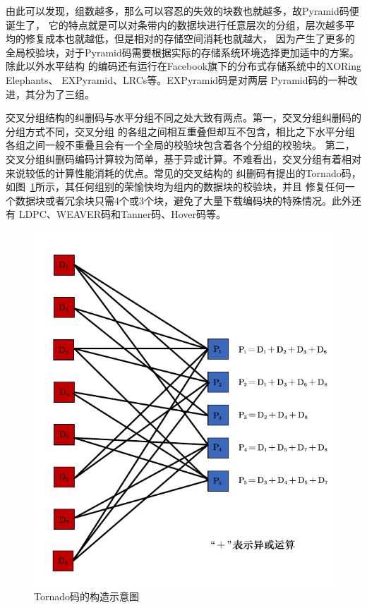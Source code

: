 由此可以发现，组数越多，那么可以容忍的失效的块数也就越多，故Pyramid码\cite{huang2013pyramid}便诞生了，
它的特点就是可以对条带内的数据块进行任意层次的分组，层次越多平均的修复成本也就越低，但是相对的存储空间消耗也就越大，
因为产生了更多的全局校验块，对于Pyramid码需要根据实际的存储系统环境选择更加适中的方案。除此以外水平结构
的编码还有运行在Facebook旗下的分布式存储系统中的XORing Elephants\cite{sathiamoorthy2013xoring}、
EXPyramid\cite{周松2011expyramid}、LRCs\cite{sathiamoorthy2013xoring}等。EXPyramid码是对两层
Pyramid码的一种改进，其分为了三组。

交叉分组结构的纠删码与水平分组不同之处大致有两点。第一，交叉分组纠删码的分组方式不同，交叉分组
的各组之间相互重叠但却互不包含，相比之下水平分组各组之间一般不重叠且会有一个全局的校验块包含着各个分组的校验块。
第二，交叉分组纠删码编码计算较为简单，基于异或计算。不难看出，交叉分组有着相对来说较低的计算性能消耗的优点。常见的交叉结构的
纠删码有\citet{woitaszek2007tornado}提出的Tornado码，如图~\ref{fig:con-1.8}所示，其任何组别的荣愉快均为组内的数据块的校验块，并且
修复任何一个数据块或者冗余块只需4个或3个块，避免了大量下载编码块的特殊情况。此外还有
LDPC\cite{gallager1962low}、WEAVER码\cite{hafner2005weaver}和Tanner码、Hover码\cite{hafner2006hover}等。


\begin{figure}[tb]
	\centering
	\includegraphics [scale=0.7]{figures/1.8.pdf}
	\caption{Tornado码的构造示意图}
	\label{fig:con-1.8}
\end{figure}




